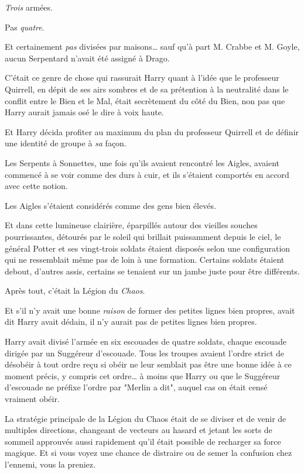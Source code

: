 \emph{Trois} armées.

Pas \emph{quatre}.

Et certainement \emph{pas} divisées par maisons… sauf qu'à part M. Crabbe et M. Goyle, aucun Serpentard n'avait été assigné à Drago.

C'était ce genre de chose qui rassurait Harry quant à l'idée que le professeur Quirrell, en dépit de ses airs sombres et de sa prétention à la neutralité dans le conflit entre le Bien et le Mal, était secrètement du côté du Bien, non pas que Harry aurait jamais osé le dire à voix haute.

Et Harry décida profiter au maximum du plan du professeur Quirrell et de définir une identité de groupe à \emph{sa} façon.

Les Serpents à Sonnettes, une fois qu'ils avaient rencontré les Aigles, avaient commencé à se voir comme des durs à cuir, et ils s'étaient comportés en accord avec cette notion.

Les Aigles s'étaient considérés comme des gens bien élevés.

Et dans cette lumineuse clairière, éparpillés autour des vieilles souches pourrissantes, détourés par le soleil qui brillait puissamment depuis le ciel, le général Potter et ses vingt-trois soldats étaient disposés selon une configuration qui ne ressemblait même pas de loin à une formation. Certains soldats étaient debout, d'autres assis, certains se tenaient sur un jambe juste pour être différents.

Après tout, c'était la Légion du \emph{Chaos}.

Et s'il n'y avait une bonne \emph{raison} de former des petites lignes bien propres, avait dit Harry avait dédain, il n'y aurait pas de petites lignes bien propres.

Harry avait divisé l'armée en six escouades de quatre soldats, chaque escouade dirigée par un Suggéreur d'escouade. Tous les troupes avaient l'ordre strict de désobéir à tout ordre reçu si obéir ne leur semblait pas être une bonne idée à ce moment précis, y compris cet ordre… à moins que Harry ou que le Suggéreur d'escouade ne préfixe l'ordre par "Merlin a dit", auquel cas on était censé vraiment obéir.

La stratégie principale de la Légion du Chaos était de se diviser et de venir de multiples directions, changeant de vecteurs au hasard et jetant les sorts de sommeil approuvés aussi rapidement qu'il était possible de recharger sa force magique. Et si vous voyez une chance de distraire ou de semer la confusion chez l'ennemi, vous la preniez.

